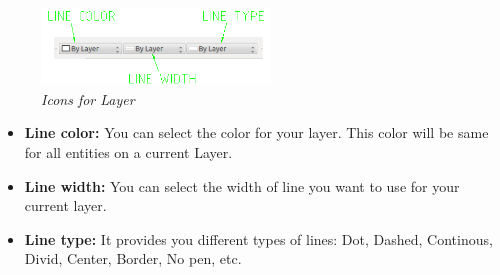 \begin{enumerate}
{\begin{figure}[h!]
       \centering\includegraphics[width=230px]{./images/layer_set.png}
       \caption{\small \sl Icons for Layer}
       \end{figure}
     \begin{itemize}
     \item{\textbf{Line color:} You can select the color for your layer. This color will be same for all entities on a current Layer.}
     \item{\textbf{Line width:} You can select the width of line you want to use for your current layer.}
     \item{\textbf{Line type:} It provides you different types of lines: Dot, Dashed, Continous, Divid, Center, Border, No pen, etc.}
     \end{itemize}}
\end{enumerate}
